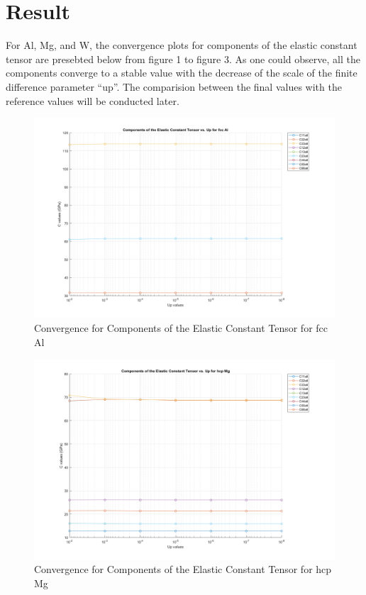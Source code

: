 \documentclass[a4paper,11pt]{article} %
\begin{document}
\section*{Result}
For Al, Mg, and W, the convergence plots for components of the elastic constant tensor are presebted below from figure 1 to figure 3. As one could observe, all the components converge to a stable value with the decrease of the scale of the finite difference parameter ``up''. The comparision between the final values with the reference values will be conducted later.
\begin{figure}[ht]
    \centering
    \includegraphics[width=1.1\textwidth]{Al.png}
    \caption{Convergence for Components of the Elastic Constant Tensor for fcc Al}
\end{figure}

\begin{figure}[ht]
    \centering
    \includegraphics[width=1.1\textwidth]{Mg.png}
    \caption{Convergence for Components of the Elastic Constant Tensor for hcp Mg}
\end{figure}
\end{document}
